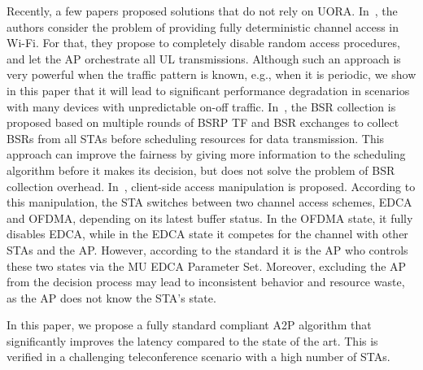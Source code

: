 Recently, a few papers proposed solutions that do not rely on UORA.
In~\cite{1_Schneider}, the authors consider the problem of providing fully
deterministic channel access in Wi-Fi. For that, they propose to completely
disable random access procedures, and let the AP orchestrate all UL
transmissions. Although such an approach is very powerful when the traffic
pattern is known, e.g., when it is periodic, we show in this paper that it will
lead to significant performance degradation in scenarios with many devices with
unpredictable on-off traffic.
In~\cite{shao2024access}, the BSR collection is proposed based on multiple
rounds of BSRP TF and BSR exchanges to collect BSRs from all STAs before
scheduling resources for data transmission. This approach can improve the
fairness by giving more information to the scheduling algorithm before it makes
its decision, but does not solve the problem of BSR collection overhead.
In~\cite{goncalves2023access}, client-side access manipulation is proposed.
According to this manipulation, the STA switches between two channel access
schemes, EDCA and OFDMA, depending on its latest buffer status. In the OFDMA
state, it fully disables EDCA, while in the EDCA state it competes for the
channel with other STAs and the AP. However, according to the standard it is
the AP who controls these two states via the MU EDCA Parameter Set. Moreover,
excluding the AP from the decision process may lead to inconsistent behavior
and resource waste, as the AP does not know the STA's state.

In this paper, we propose a fully standard compliant A2P algorithm that
significantly improves the latency compared to the state of the art. This is
verified in a challenging teleconference scenario with a high number of STAs.